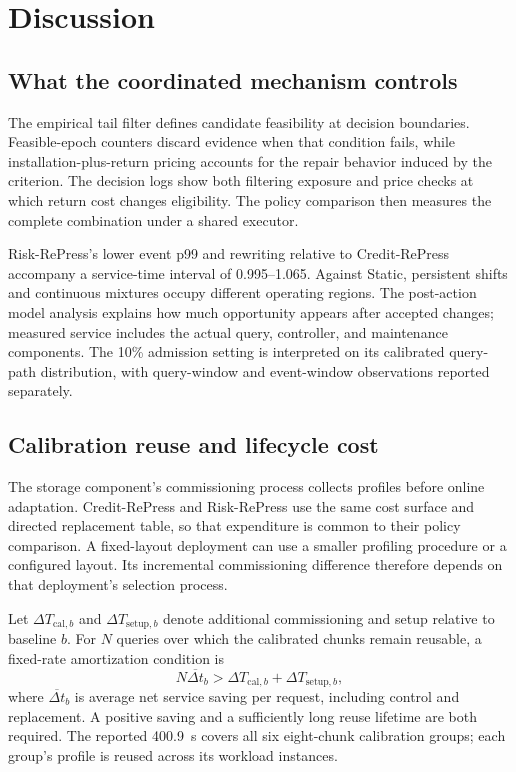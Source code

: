 \section{Discussion}
\label{sec:discussion}
\subsection{What the coordinated mechanism controls}
The empirical tail filter defines candidate feasibility at decision boundaries. Feasible-epoch counters discard evidence when that condition fails, while installation-plus-return pricing accounts for the repair behavior induced by the criterion. The decision logs show both filtering exposure and price checks at which return cost changes eligibility. The policy comparison then measures the complete combination under a shared executor.

Risk-RePress's lower event p99 and rewriting relative to Credit-RePress accompany a service-time interval of 0.995--1.065. Against Static, persistent shifts and continuous mixtures occupy different operating regions. The post-action model analysis explains how much opportunity appears after accepted changes; measured service includes the actual query, controller, and maintenance components. The 10\% admission setting is interpreted on its calibrated query-path distribution, with query-window and event-window observations reported separately.

\subsection{Calibration reuse and lifecycle cost}
The storage component's commissioning process collects profiles before online adaptation. Credit-RePress and Risk-RePress use the same cost surface and directed replacement table, so that expenditure is common to their policy comparison. A fixed-layout deployment can use a smaller profiling procedure or a configured layout. Its incremental commissioning difference therefore depends on that deployment's selection process.

Let $\Delta T_{\mathrm{cal},b}$ and $\Delta T_{\mathrm{setup},b}$ denote additional commissioning and setup relative to baseline $b$. For $N$ queries over which the calibrated chunks remain reusable, a fixed-rate amortization condition is
\begin{equation}
N\overline{\Delta t}_b>
\Delta T_{\mathrm{cal},b}+\Delta T_{\mathrm{setup},b},
\label{eq:amortization}
\end{equation}
where $\overline{\Delta t}_b$ is average net service saving per request, including control and replacement. A positive saving and a sufficiently long reuse lifetime are both required. The reported 400.9~s covers all six eight-chunk calibration groups; each group's profile is reused across its workload instances.

